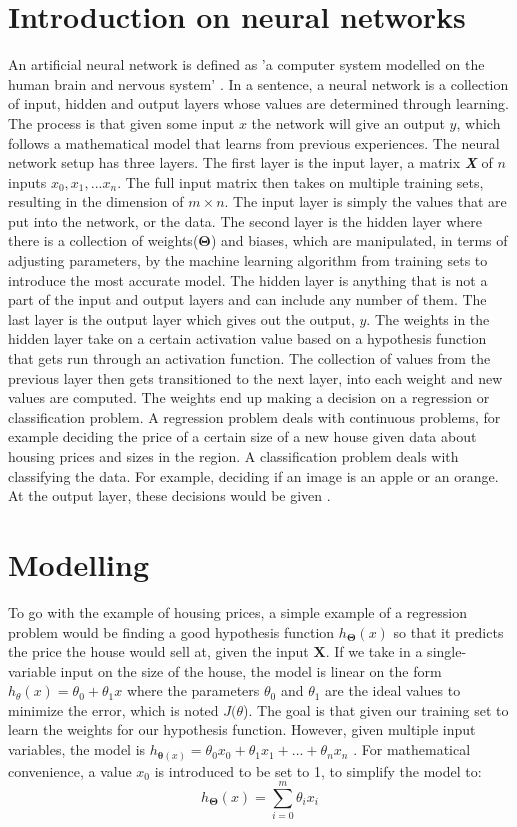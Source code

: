 \documentclass[a4paper,12pt]{article}
\begin{document}
\section{Introduction on neural networks}
An artificial neural network is defined as 'a computer system modelled on the human brain and nervous system' \cite{nndef}. In a sentence, a neural network is a collection of input, hidden and output layers whose values are determined through learning. The process is that given some input $x$ the network will give an output \(y\), which follows a mathematical model that learns from previous experiences. The neural network setup has three layers. The first layer is the input layer, a matrix \textbf{\emph{X}} of \(n\) inputs \(x_0,x_1,...x_n\). The full input matrix then takes on multiple training sets, resulting in the dimension of $m \times n$. The input layer is simply the values that are put into the network, or the data. The second layer is the hidden layer where there is a collection of weights(\(\boldsymbol{\Theta}\)) and biases, which are manipulated, in terms of adjusting parameters, by the machine learning algorithm from training sets to introduce the most accurate model. The hidden layer is anything that is not a part of the input and output layers and can include any number of them. The last layer is the output layer which gives out the output, \(y\). The weights in the hidden layer take on a certain activation value based on a hypothesis function that gets run through an activation function. The collection of values from the previous layer then gets transitioned to the next layer, into each weight and new values are computed. The weights end up making a decision on a regression or classification problem. A regression problem deals with continuous problems, for example deciding the price of a certain size of a new house given data about housing prices and sizes in the region. A classification problem deals with classifying the data. For example, deciding if an image is an apple or an orange. At the output layer, these decisions would be given \cite{patternml}.

\section{Modelling}
To go with the example of housing prices, a simple example of a regression problem would be finding a good hypothesis function \(h_{\boldsymbol{\Theta}}(x)\) so that it predicts the price the house would sell at, given the input $\boldsymbol{X}$. If we take in a single-variable input on the size of the house, the model is linear on the form  \(h_\theta(x) = \theta_0 + \theta_1x\) where the parameters \(\theta_0\) and \(\theta_1\) are the ideal values to minimize the error, which is noted \(J(\theta\)). The goal is that given our training set to learn the weights for our hypothesis function. However, given multiple input variables, the model is \(h_{\boldsymbol{\theta}(x)} = \theta_0x_0 + \theta_1x_1 + ... + \theta_nx_n\) \cite{patternml}. For mathematical convenience, a value $x_0$ is introduced to be set to 1, to simplify the model to:
\[h_{\boldsymbol{\Theta}}(x) = \sum_{i = 0}^m \theta_ix_i\]
\end{document}

